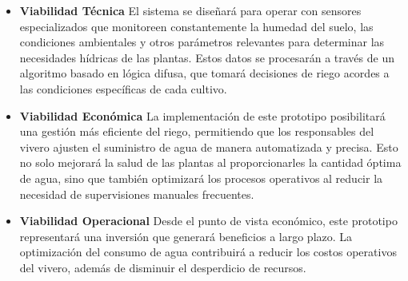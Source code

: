 \begin{itemize}
    \bigbreak 
    \item \textbf{Viabilidad Técnica}
          \bigbreak
          El sistema se diseñará para operar con sensores especializados que monitoreen constantemente la humedad del suelo, las condiciones ambientales y otros parámetros relevantes para determinar las necesidades hídricas de las plantas. Estos datos se procesarán a través de un algoritmo basado en lógica difusa, que tomará decisiones de riego acordes a las condiciones específicas de cada cultivo.

    \item \textbf{Viabilidad Económica}
          \bigbreak
          La implementación de este prototipo posibilitará una gestión más eficiente del riego, permitiendo que los responsables del vivero ajusten el suministro de agua de manera automatizada y precisa. Esto no solo mejorará la salud de las plantas al proporcionarles la cantidad óptima de agua, sino que también optimizará los procesos operativos al reducir la necesidad de supervisiones manuales frecuentes.

    \item \textbf{Viabilidad Operacional}
          \bigbreak
          Desde el punto de vista económico, este prototipo representará una inversión que generará beneficios a largo plazo. La optimización del consumo de agua contribuirá a reducir los costos operativos del vivero, además de disminuir el desperdicio de recursos.
\end{itemize}
